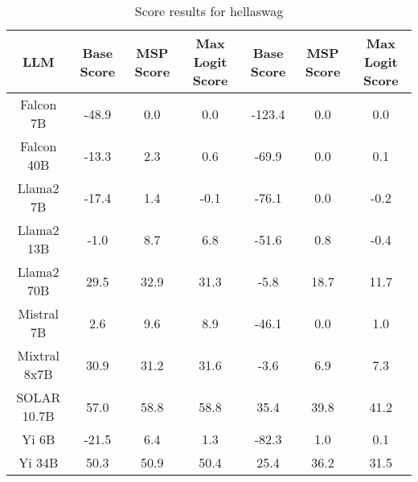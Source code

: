 \renewcommand\arraystretch{1.2}
\begin{table*}
\centering
\begin{tabular}{c|c|c|c|c|c|c}
LLM & Base Score & MSP Score & Max Logit Score & Base Score & MSP Score & Max Logit Score\\ \hline
Falcon 7B & -48.9 & 0.0 & 0.0 & -123.4 & 0.0 & 0.0\\
Falcon 40B & -13.3 & 2.3 & 0.6 & -69.9 & 0.0 & 0.1\\
Llama2 7B & -17.4 & 1.4 & -0.1 & -76.1 & 0.0 & -0.2\\
Llama2 13B & -1.0 & 8.7 & 6.8 & -51.6 & 0.8 & -0.4\\
Llama2 70B & 29.5 & 32.9 & 31.3 & -5.8 & 18.7 & 11.7\\
Mistral 7B & 2.6 & 9.6 & 8.9 & -46.1 & 0.0 & 1.0\\
Mixtral 8x7B & 30.9 & 31.2 & 31.6 & -3.6 & 6.9 & 7.3\\
SOLAR 10.7B & 57.0 & 58.8 & 58.8 & 35.4 & 39.8 & 41.2\\
Yi 6B & -21.5 & 6.4 & 1.3 & -82.3 & 1.0 & 0.1\\
Yi 34B & 50.3 & 50.9 & 50.4 & 25.4 & 36.2 & 31.5\\
\hline
\end{tabular}
\caption{Score results for hellaswag}
\end{table*}
\label{tab:hellaswag_score}

